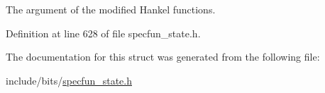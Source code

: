 The argument of the modified Hankel functions. 



Definition at line 628 of file specfun\+\_\+state.\+h.



The documentation for this struct was generated from the following file\+:\begin{DoxyCompactItemize}
\item 
include/bits/\hyperlink{specfun__state_8h}{specfun\+\_\+state.\+h}\end{DoxyCompactItemize}
